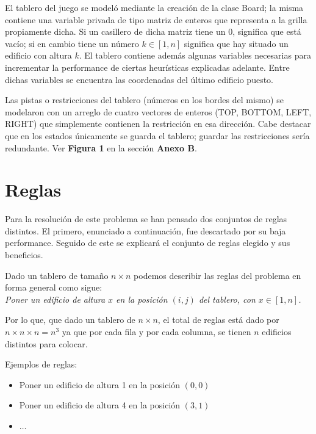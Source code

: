 \documentclass[%
    final,
    reprint,
    notitlepage,
    narroweqnarray,
    inline,
    twoside,
    invited
    ]{ieee}
\begin{document}
\par El tablero del juego se modeló mediante la creación de la clase Board; la misma contiene una variable privada de tipo matriz de 
enteros que representa a la grilla propiamente dicha. Si un casillero de dicha matriz  tiene un $0$, significa que  está vacío; si en cambio 
tiene un número $k \in [1,n]$ significa que hay situado un edificio con altura $k$. El tablero contiene además algunas variables necesarias para 
incrementar la performance de ciertas heurísticas explicadas adelante. Entre dichas variables se encuentra las coordenadas del último edificio puesto.\\
\par Las pistas o restricciones del tablero (números en los bordes del mismo) se modelaron con un arreglo de cuatro 
vectores de enteros (TOP, BOTTOM, LEFT, RIGHT) que simplemente contienen la restricción en esa dirección.
Cabe destacar que en los estados únicamente se guarda el tablero; guardar las restricciones sería redundante. 
Ver \textbf{Figura 1} en la sección \textbf{Anexo B}.\\



\section{Reglas}

\par Para la resolución de este problema se han pensado dos conjuntos de reglas distintos. El primero, enunciado a continuación, fue descartado por su baja performance. Seguido de este se explicará el conjunto de reglas elegido y sus beneficios.\\

\par Dado un tablero de tamaño $n\times n$ podemos describir las reglas del problema en forma general como sigue:\\

\emph{Poner un edificio de altura $x$ en la posición $(i,j)$ del tablero, con $x \in [1, n]$.}\\

\par Por lo que, que dado un tablero de $n\times n$, el total de reglas está dado por $n \times {n \times n} = n^3$ ya que por cada fila y por cada columna, se tienen $n$ edificios distintos para colocar. 
\par Ejemplos de reglas:
\begin{itemize}
\item Poner un edificio de altura 1 en la posición $(0,0)$
\item Poner un edificio de altura 4 en la posición $(3,1)$
\item $\ldots$

\end{itemize}
\end{document}
